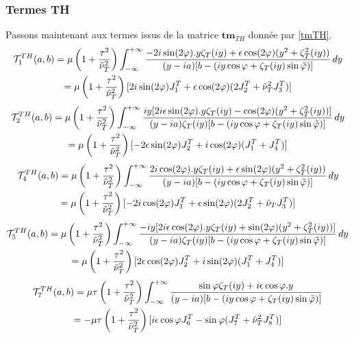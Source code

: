 \subsubsection{Termes TH}
Passons maintenant aux termes issus de la matrice $\mathbf{tm}_{TH}$ donnée par \eqref{tmTH}.
\begin{multline}
\mathcal{T}_1^{TH}(a,b)=\mu\left(1+\frac{\tau^2}{\nuti_T^2}\right)\int_{-\infty}^{+\infty} \frac{-2i\sin(2\varphi).y\zeta_T(iy)+\epsilon \cos (2\varphi)(y^2+\zeta_T^2(iy))}{(y-ia)\lbrack b-(iy\cos \varphi+ \zeta_T(iy)\sin\phiti) \rbrack} \, dy \\
\hfill=\mu\left(1+\frac{\tau^2}{\nuti_T^2}\right) \lbrack 2i\sin(2\varphi)J_1^T+\epsilon\cos(2\varphi)(2J_2^T+\nuti_T^2 J_3^T)\rbrack \hfill
\end{multline}
\begin{multline}
\mathcal{T}_2^{TH}(a,b)=\mu\left(1+\frac{\tau^2}{\nuti_T^2}\right)\int_{-\infty}^{+\infty} \frac{iy\lbrack 2i\epsilon \sin(2\varphi).y\zeta_T(iy)- \cos (2\varphi)(y^2+\zeta_T^2(iy))\rbrack}{(y-ia)\zeta_T(iy)\lbrack b-(iy\cos \varphi+ \zeta_T(iy)\sin\phiti) \rbrack} \, dy \\
\hfill= \mu\left(1+\frac{\tau^2}{\nuti_T^2}\right) \lbrack -2\epsilon\sin(2\varphi)J_2^T+i\cos(2\varphi)(J_1^T+J_4^T) \rbrack \hfill
\end{multline}
\begin{multline}
\mathcal{T}_4^{TH}(a,b)=\mu\left(1+\frac{\tau^2}{\nuti_T^2}\right)\int_{-\infty}^{+\infty} \frac{2i\cos(2\varphi).y\zeta_T(iy)+\epsilon \sin (2\varphi)(y^2+\zeta_T^2(iy))}{(y-ia)\lbrack b-(iy\cos \varphi+ \zeta_T(iy)\sin\phiti) \rbrack} \, dy \\
\hfill =\mu\left(1+\frac{\tau^2}{\nuti_T^2}\right) \lbrack -2i\cos(2\varphi)J_1^T+\epsilon \sin(2\varphi)(2J_2^T+\nuti_TJ_3^T) \rbrack \hfill
\end{multline}
\begin{multline}
\mathcal{T}_5^{TH}(a,b)=\mu\left(1+\frac{\tau^2}{\nuti_T^2}\right)\int_{-\infty}^{+\infty} \frac{-iy\lbrack 2i\epsilon \cos(2\varphi).y\zeta_T(iy)+\sin (2\varphi)(y^2+\zeta_T^2(iy))\rbrack}{(y-ia)\zeta_T(iy)\lbrack b-(iy\cos \varphi+ \zeta_T(iy)\sin\phiti) \rbrack} \, dy \\
\hfill =\mu\left(1+\frac{\tau^2}{\nuti_T^2}\right) \lbrack 2\epsilon\cos(2\varphi)J_2^T+i\sin(2\varphi)(J_1^T+J_4^T)\rbrack \hfill
\end{multline}
\begin{multline}
\mathcal{T}_7^{TH}(a,b)=\mu\tau\left(1+\frac{\tau^2}{\nuti_T^2}\right)\int_{-\infty}^{+\infty} \frac{\sin\varphi\zeta_T(iy)+i\epsilon\cos\varphi.y}{(y-ia)\lbrack b-(iy\cos \varphi+ \zeta_T(iy)\sin\phiti) \rbrack} \\
\hfill = -\mu\tau\left(1+\frac{\tau^2}{\nuti_T^2}\right)\lbrack i\epsilon\cos\varphi J_6^T-\sin\varphi(J_7^T+\nuti_T^2J_8^T)\rbrack \hfill
\end{multline}
